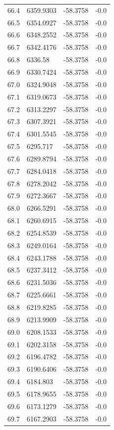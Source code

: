 \begin{table}[H]
\begin{tabular}{llll}
66.4 & 6359.9303 & -58.3758 & -0.0 \\
66.5 & 6354.0927 & -58.3758 & -0.0 \\
66.6 & 6348.2552 & -58.3758 & -0.0 \\
66.7 & 6342.4176 & -58.3758 & -0.0 \\
66.8 & 6336.58 & -58.3758 & -0.0 \\
66.9 & 6330.7424 & -58.3758 & -0.0 \\
67.0 & 6324.9048 & -58.3758 & -0.0 \\
67.1 & 6319.0673 & -58.3758 & -0.0 \\
67.2 & 6313.2297 & -58.3758 & -0.0 \\
67.3 & 6307.3921 & -58.3758 & -0.0 \\
67.4 & 6301.5545 & -58.3758 & -0.0 \\
67.5 & 6295.717 & -58.3758 & -0.0 \\
67.6 & 6289.8794 & -58.3758 & -0.0 \\
67.7 & 6284.0418 & -58.3758 & -0.0 \\
67.8 & 6278.2042 & -58.3758 & -0.0 \\
67.9 & 6272.3667 & -58.3758 & -0.0 \\
68.0 & 6266.5291 & -58.3758 & -0.0 \\
68.1 & 6260.6915 & -58.3758 & -0.0 \\
68.2 & 6254.8539 & -58.3758 & -0.0 \\
68.3 & 6249.0164 & -58.3758 & -0.0 \\
68.4 & 6243.1788 & -58.3758 & -0.0 \\
68.5 & 6237.3412 & -58.3758 & -0.0 \\
68.6 & 6231.5036 & -58.3758 & -0.0 \\
68.7 & 6225.6661 & -58.3758 & -0.0 \\
68.8 & 6219.8285 & -58.3758 & -0.0 \\
68.9 & 6213.9909 & -58.3758 & -0.0 \\
69.0 & 6208.1533 & -58.3758 & -0.0 \\
69.1 & 6202.3158 & -58.3758 & -0.0 \\
69.2 & 6196.4782 & -58.3758 & -0.0 \\
69.3 & 6190.6406 & -58.3758 & -0.0 \\
69.4 & 6184.803 & -58.3758 & -0.0 \\
69.5 & 6178.9655 & -58.3758 & -0.0 \\
69.6 & 6173.1279 & -58.3758 & -0.0 \\
69.7 & 6167.2903 & -58.3758 & -0.0 \\

\end{tabular}
\end{table}
